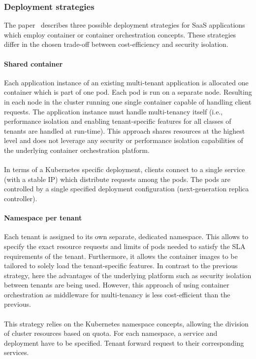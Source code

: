 \subsubsection{Deployment strategies}
The paper~\cite{TruyenEddy2016Taca} describes three possible deployment strategies for SaaS applications which employ container or container orchestration concepts. These strategies differ in the chosen trade-off between cost-efficiency and security isolation.

\paragraph{Shared container}
Each application instance of an existing multi-tenant application is allocated one container which is part of one pod. Each pod is run on a separate node. Resulting in each node in the cluster running one single container capable of handling client requests. The application instance must handle multi-tenancy itself (i.e., performance isolation and enabling tenant-specific features for all classes of tenants are handled at run-time). This approach shares resources at the highest level and does not leverage any security or performance isolation capabilities of the underlying container orchestration platform.\\\\
In terms of a Kubernetes specific deployment, clients connect to a single service (with a stable IP) which distribute requests among the pods. The pods are controlled by a single specified deployment configuration (next-generation replica controller).~\cite{TruyenEddy2016Taca}
\paragraph{Namespace per tenant}
Each tenant is assigned to its own separate, dedicated namespace. This allows to specify the exact resource requests and limits of pods needed to satisfy the SLA requirements of the tenant. Furthermore, it allows the container images to be tailored to solely load the tenant-specific features. In contrast to the previous strategy, here the advantages of the underlying platform such as security isolation between tenants are being used. However, this approach of using container orchestration as  middleware for multi-tenancy is less cost-efficient than the previous.\\\\
This strategy relies on the Kubernetes namespace concepts, allowing the division of cluster resources based on quota. For each namespace, a service and deployment have to be specified.  Tenant forward request to their corresponding services.~\cite{TruyenEddy2016Taca}
